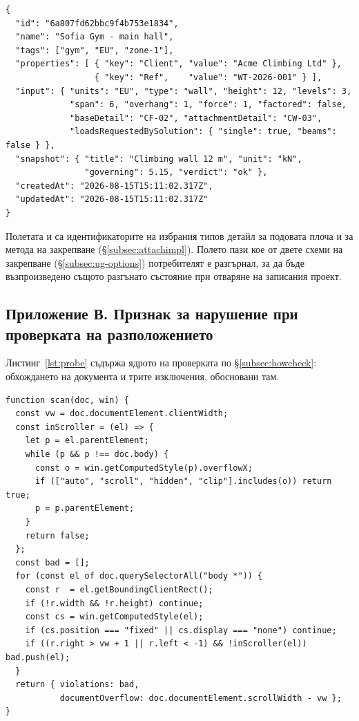 \begin{lstlisting}[language=JSONlang,caption={Публично представяне на един проект},label={lst:projfmt}]
{
  "id": "6a807fd62bbc9f4b753e1834",
  "name": "Sofia Gym - main hall",
  "tags": ["gym", "EU", "zone-1"],
  "properties": [ { "key": "Client", "value": "Acme Climbing Ltd" },
                  { "key": "Ref",    "value": "WT-2026-001" } ],
  "input": { "units": "EU", "type": "wall", "height": 12, "levels": 3,
             "span": 6, "overhang": 1, "force": 1, "factored": false,
             "baseDetail": "CF-02", "attachmentDetail": "CW-03",
             "loadsRequestedBySolution": { "single": true, "beams": false } },
  "snapshot": { "title": "Climbing wall 12 m", "unit": "kN",
                "governing": 5.15, "verdict": "ok" },
  "createdAt": "2026-08-15T15:11:02.317Z",
  "updatedAt": "2026-08-15T15:11:02.317Z"
}
\end{lstlisting}

Полетата  и  са идентификаторите на избрания
типов детайл за подовата плоча и за метода на закрепване (§\ref{subsec:attachimpl}).
Полето  пази кое от двете схеми на закрепване
(§\ref{subsec:ug-options}) потребителят е разгърнал, за да бъде възпроизведено същото
разгънато състояние при отваряне на записания проект.
\newpage
\subsection*{Приложение В. Признак за нарушение при проверката на разположението}

Листинг~\ref{lst:probe} съдържа ядрото на проверката по §\ref{subsec:howcheck}:
обхождането на документа и трите изключения, обосновани там.

\begin{lstlisting}[caption={Откриване на елементите, които разширяват страницата},label={lst:probe}]
function scan(doc, win) {
  const vw = doc.documentElement.clientWidth;
  const inScroller = (el) => {
    let p = el.parentElement;
    while (p && p !== doc.body) {
      const o = win.getComputedStyle(p).overflowX;
      if (["auto", "scroll", "hidden", "clip"].includes(o)) return true;
      p = p.parentElement;
    }
    return false;
  };
  const bad = [];
  for (const el of doc.querySelectorAll("body *")) {
    const r  = el.getBoundingClientRect();
    if (!r.width && !r.height) continue;
    const cs = win.getComputedStyle(el);
    if (cs.position === "fixed" || cs.display === "none") continue;
    if ((r.right > vw + 1 || r.left < -1) && !inScroller(el)) bad.push(el);
  }
  return { violations: bad,
           documentOverflow: doc.documentElement.scrollWidth - vw };
}
\end{lstlisting}

